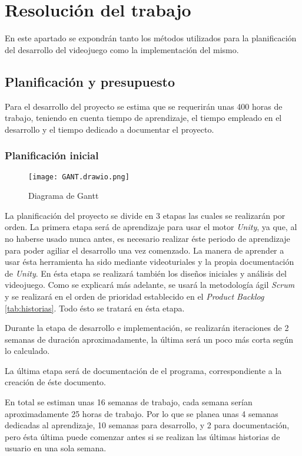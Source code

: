 \chapter{Resolución del trabajo}
\label{chap:resolucion}

En este apartado se expondrán tanto los métodos utilizados para la planificación del 
desarrollo del videojuego como la implementación del mismo.  

\section{Planificación y presupuesto}
\label{sec:planificacion}
Para el desarrollo del proyecto se estima que se requerirán  unas 400 horas de trabajo, teniendo en cuenta tiempo de aprendizaje, el tiempo empleado en el desarrollo y el tiempo dedicado a documentar el proyecto.

\subsection{Planificación inicial}

\begin{figure}[H]
    \centering
    \texttt{[image: GANT.drawio.png]}
    \caption{Diagrama de Gantt}
\end{figure}

La planificación del proyecto se divide en 3 etapas las cuales se realizarán por orden. La primera etapa será de aprendizaje para usar el motor \textit{Unity}, ya que, al no haberse usado nunca antes, es necesario realizar éste periodo de aprendizaje para poder agiliar el desarrollo una vez comenzado. La manera de aprender a usar ésta herramienta ha sido mediante videoturiales y la propia documentación de \textit{Unity}. En ésta etapa se realizará también los diseños iniciales y análisis del videojuego. Como se explicará más adelante, se usará la metodología ágil \textit{Scrum} y se realizará en el orden de prioridad establecido en el \textit{Product Backlog} \ref{tab:historias}. Todo ésto se tratará en ésta etapa.

Durante la etapa de desarrollo e implementación, se realizarán iteraciones de 2 semanas de duración aproximadamente, la última será un poco más corta según lo calculado. 

La última etapa será de documentación de el programa, correspondiente a la creación de éste documento.

En total se estiman unas 16 semanas de trabajo, cada semana serían aproximadamente 25 horas de trabajo. Por lo que se planea unas 4 semanas dedicadas al aprendizaje, 10 semanas para desarrollo, y 2 para documentación, pero ésta última puede comenzar antes si se realizan las últimas historias de usuario en una sola semana.

